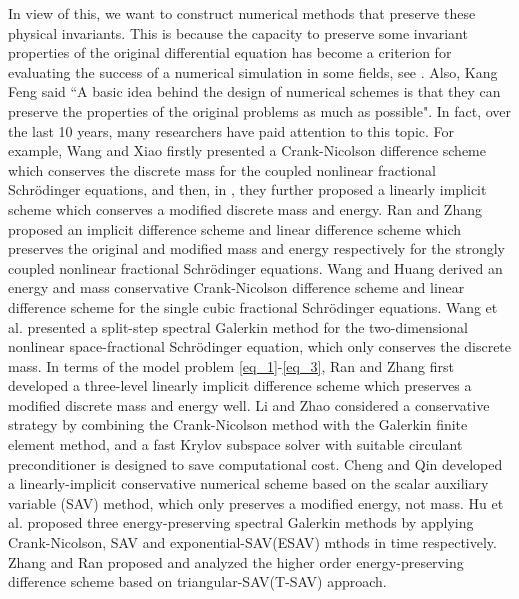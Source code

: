 \documentclass[preprint,compress,3p,10pt,fleqn]{elsarticle}
\numberwithin{equation}{section}
\begin{document}
In view of this, we want to construct numerical methods that preserve these physical invariants. This is because the capacity to preserve some invariant properties of the original differential equation has become a criterion for evaluating the success of a numerical simulation in some fields, see \cite{liFiniteDifferenceCalculus1995}.
Also, Kang Feng said ``A basic idea behind the design of numerical schemes is that they can preserve the properties of the original problems as much as possible".
In fact, over the last 10 years, many researchers have paid attention to this topic. For example, Wang and Xiao \cite{wangCrankNicolsonDifference2013}
firstly presented a Crank-Nicolson difference scheme which conserves the discrete mass for the coupled nonlinear fractional Schr{\"o}dinger equations, and then,
in \cite{wangLinearlyImplicitConservative2014}, they further proposed a linearly implicit scheme which conserves a modified discrete mass and energy. Ran and Zhang \cite{ranConservativeDifferenceScheme2016} proposed an implicit difference scheme and linear difference scheme which preserves the original and modified mass and energy respectively for the strongly coupled nonlinear fractional Schr{\"o}dinger equations.
Wang and Huang \cite{wangEnergyConservativeDifference2015,wangConservativeLinearizedDifference2015} derived an energy and mass conservative Crank-Nicolson difference scheme and linear difference scheme for the single cubic fractional Schr{\"o}dinger equations.
Wang et al. \cite{wangSplitstepSpectralGalerkin2019} presented a split-step spectral Galerkin method for the two-dimensional nonlinear space-fractional
Schr{\"o}dinger equation, which only conserves the discrete mass.
In terms of the model problem \eqref{eq_1}-\eqref{eq_3}, Ran and Zhang \cite{ranLinearlyImplicitConservative2016} first developed a three-level linearly implicit difference scheme which preserves a modified discrete mass and energy well.
Li and Zhao  \cite{liFastEnergyConserving2018} considered a conservative strategy by combining the Crank-Nicolson method with the Galerkin finite element method, and a fast Krylov subspace solver with suitable circulant preconditioner is designed to save computational cost.
Cheng and Qin  \cite{chengConvergenceEnergyconservingScheme2022} developed a linearly-implicit conservative numerical scheme based on the scalar auxiliary variable (SAV) method, which only preserves a modified energy, not mass.
Hu et al. \cite{huEfficientEnergyPreserving2022} proposed three energy-preserving spectral Galerkin methods by applying Crank-Nicolson, SAV and exponential-SAV(ESAV) mthods in time respectively.
Zhang and Ran \cite{zhangHighorderStructurepreservingDifference2023} proposed and analyzed the higher order energy-preserving difference scheme based on triangular-SAV(T-SAV) approach.
\end{document}
